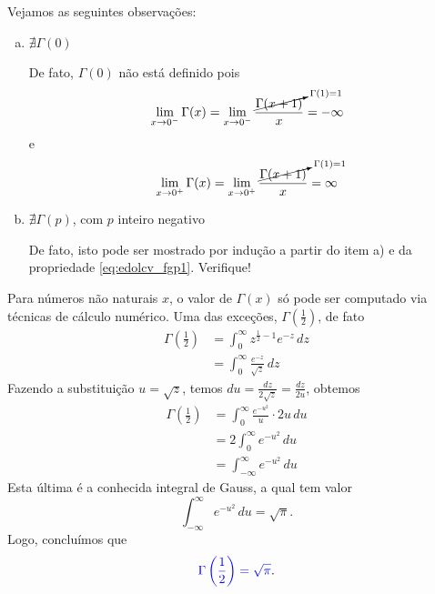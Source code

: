 \begin{obs} Vejamos as seguintes observações:
  \begin{enumerate}[a)]
  \item $\nexists\Gamma(0)$

    De fato, $\Gamma(0)$ não está definido pois
    \begin{equation}
      \lim_{x\to 0^-} \Gamma(x) = \lim_{x\to 0^-} \frac{\cancelto{\Gamma(1)=1}{\Gamma(x+1)}}{x} = -\infty
    \end{equation}
    e
    \begin{equation}
      \lim_{x\to 0^+} \Gamma(x) = \lim_{x\to 0^+} \frac{\cancelto{\Gamma(1)=1}{\Gamma(x+1)}}{x} = \infty
    \end{equation}

  \item $\nexists\Gamma(p)$, com $p$ inteiro negativo

    De fato, isto pode ser mostrado por indução a partir do item a) e da propriedade \eqref{eq:edolcv_fgp1}. Verifique!
  \end{enumerate}
\end{obs}

\begin{obs}
  Para números não naturais $x$, o valor de $\Gamma(x)$ só pode ser computado via técnicas de cálculo numérico. Uma das exceções, $\Gamma(\frac{1}{2})$, de fato
  \begin{align}
    \Gamma\left(\frac{1}{2}\right) &= \int_0^\infty z^{\frac{1}{2}-1}e^{-z}\,dz\\
                                   &= \int_0^\infty \frac{e^{-z}}{\sqrt{z}}\,dz
  \end{align}
  Fazendo a substituição $u=\sqrt{z}$, temos $\displaystyle du = \frac{dz}{2\sqrt{z}} = \frac{dz}{2u}$, obtemos
  \begin{align}
    \Gamma\left(\frac{1}{2}\right) &= \int_0^\infty \frac{e^{-u^2}}{u}\cdot 2u\,du \\
                                   &= 2\int_0^\infty e^{-u^2}\,du \\
                                   &= \int_{-\infty}^\infty e^{-u^2}\,du
  \end{align}
  Esta última é a conhecida integral de Gauss, a qual tem valor
  \begin{equation}
    \int_{-\infty}^\infty e^{-u^2}\,du = \sqrt{\pi}.
  \end{equation}
  Logo, concluímos que
  \begin{equation}\label{eq:edolcv_g12}
    {\color{blue}\Gamma\left(\frac{1}{2}\right) = \sqrt{\pi}}.
  \end{equation}
\end{obs}

